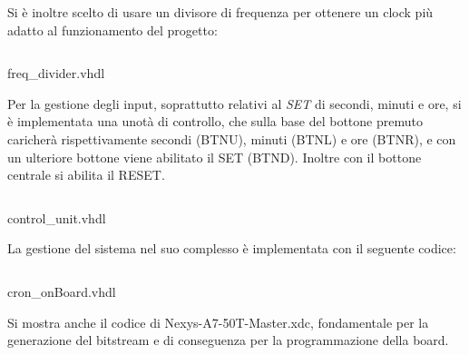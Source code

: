 Si è inoltre scelto di usare un divisore di frequenza per ottenere un clock più adatto al funzionamento del progetto:
\begin{code}
    \inputminted[frame=lines, framesep=2mm, baselinestretch=1.2, bgcolor=LightGray, fontsize=\footnotesize, linenos]{vhdl}{vhdl_files/cron_board/freq_divider.vhd}
    \caption{freq\_divider.vhdl}
    \label{lbl:ROMC}
\end{code}
Per la gestione degli input, soprattutto relativi al \textit{SET} di secondi, minuti e ore, si è implementata una unotà di controllo, che sulla base del bottone premuto caricherà rispettivamente secondi (BTNU), minuti (BTNL) e ore (BTNR), e con un ulteriore bottone viene abilitato il SET (BTND). Inoltre con il bottone centrale si abilita il RESET.
\begin{code}
    \inputminted[frame=lines, framesep=2mm, baselinestretch=1.2, bgcolor=LightGray, fontsize=\footnotesize, linenos]{vhdl}{vhdl_files/cron_board/control_unit.vhd}
    \caption{control\_unit.vhdl}
    \label{lbl:ROMC}
\end{code}
La gestione del sistema nel suo complesso è implementata con il seguente codice:
\begin{code}
    \inputminted[frame=lines, framesep=2mm, baselinestretch=1.2, bgcolor=LightGray, fontsize=\footnotesize, linenos]{vhdl}{vhdl_files/cron_board/cron_onBOARD.vhd}
    \caption{cron\_onBoard.vhdl}
    \label{lbl:ROMC}
\end{code}
Si mostra anche il codice di Nexys-A7-50T-Master.xdc, fondamentale per la generazione del bitstream e di conseguenza per la programmazione della board.
